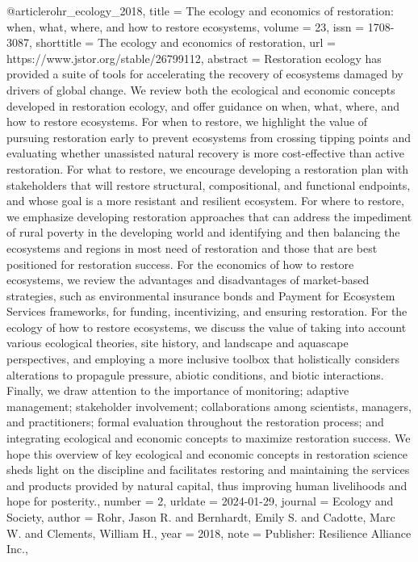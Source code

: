 {{{@article{rohr_ecology_2018,
	title = {The ecology and economics of restoration: when, what, where, and how to restore ecosystems},
	volume = {23},
	issn = {1708-3087},
	shorttitle = {The ecology and economics of restoration},
	url = {https://www.jstor.org/stable/26799112},
	abstract = {Restoration ecology has provided a suite of tools for accelerating the recovery of ecosystems damaged by drivers of global change. We review both the ecological and economic concepts developed in restoration ecology, and offer guidance on when, what, where, and how to restore ecosystems. For when to restore, we highlight the value of pursuing restoration early to prevent ecosystems from crossing tipping points and evaluating whether unassisted natural recovery is more cost-effective than active restoration. For what to restore, we encourage developing a restoration plan with stakeholders that will restore structural, compositional, and functional endpoints, and whose goal is a more resistant and resilient ecosystem. For where to restore, we emphasize developing restoration approaches that can address the impediment of rural poverty in the developing world and identifying and then balancing the ecosystems and regions in most need of restoration and those that are best positioned for restoration success. For the economics of how to restore ecosystems, we review the advantages and disadvantages of market-based strategies, such as environmental insurance bonds and Payment for Ecosystem Services frameworks, for funding, incentivizing, and ensuring restoration. For the ecology of how to restore ecosystems, we discuss the value of taking into account various ecological theories, site history, and landscape and aquascape perspectives, and employing a more inclusive toolbox that holistically considers alterations to propagule pressure, abiotic conditions, and biotic interactions. Finally, we draw attention to the importance of monitoring; adaptive management; stakeholder involvement; collaborations among scientists, managers, and practitioners; formal evaluation throughout the restoration process; and integrating ecological and economic concepts to maximize restoration success. We hope this overview of key ecological and economic concepts in restoration science sheds light on the discipline and facilitates restoring and maintaining the services and products provided by natural capital, thus improving human livelihoods and hope for posterity.},
	number = {2},
	urldate = {2024-01-29},
	journal = {Ecology and Society},
	author = {Rohr, Jason R. and Bernhardt, Emily S. and Cadotte, Marc W. and Clements, William H.},
	year = {2018},
	note = {Publisher: Resilience Alliance Inc.},
}

}}}
